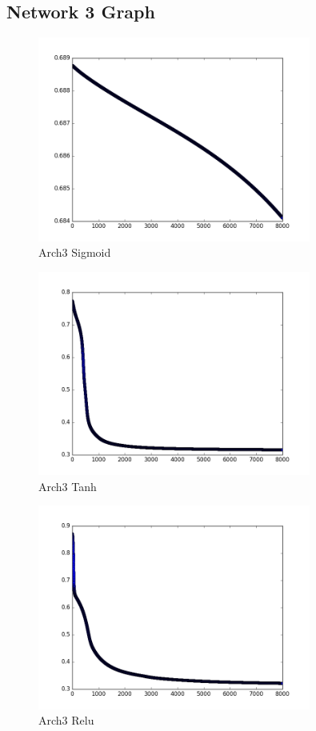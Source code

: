 \documentclass{article}
\begin{document}
\subsection{Network 3 Graph}
\begin{figure}[H]
  \caption{Arch3 Sigmoid}
  \centering
  \includegraphics[width=0.8\textwidth]{arch3sigmoid}
\end{figure}
\begin{figure}[H]
  \caption{Arch3 Tanh}
  \centering
  \includegraphics[width=0.8\textwidth]{arch3tanh}
\end{figure}
\begin{figure}[H]
  \caption{Arch3 Relu}
  \centering
  \includegraphics[width=0.8\textwidth]{arch3relu}
\end{figure}
\end{document}
